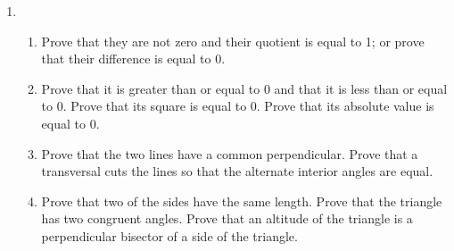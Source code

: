 \begin{enumerate}
\item \begin{enumerate} 
\item Prove that they are not zero and their quotient is equal to 1; or prove that their difference is equal to 0.

\item Prove that it is greater than or equal to 0 and that it is less than or equal to 0.  Prove that its square is equal to 0.  Prove that its absolute value is equal to 0.

\item Prove that the two lines have a common perpendicular.  Prove that a transversal cuts the lines so that the alternate interior angles are equal.
\item Prove that two of the sides have the same length.  Prove that the triangle has two congruent angles.  Prove that an altitude of the triangle is a perpendicular bisector of a side of the triangle.
\end{enumerate}
\end{enumerate}





